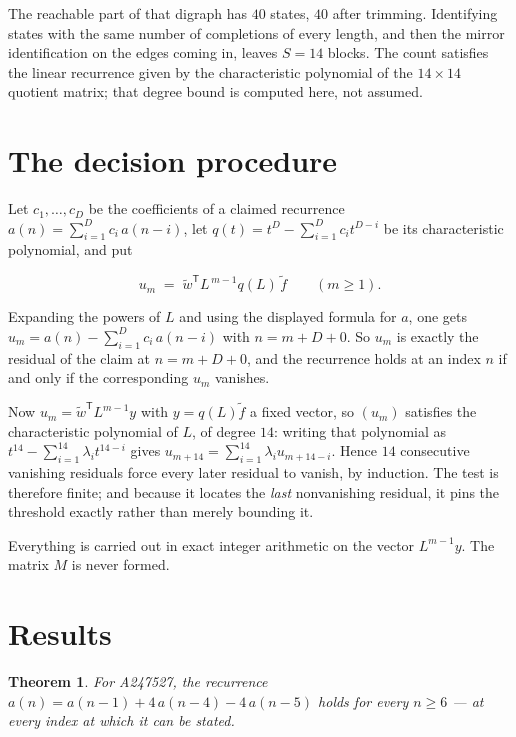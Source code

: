 \documentclass[11pt]{article}
\newtheorem{theorem}{Theorem}
\theoremstyle{definition}
\begin{document}
The reachable part of that digraph has $40$ states, $40$ after trimming. Identifying states with the same number of completions of every length, and then the mirror identification on the edges coming in, leaves $S = 14$ blocks. The count satisfies the linear recurrence given by the characteristic polynomial of the $14\times14$ quotient matrix; that degree bound is computed here, not assumed.

\section{The decision procedure}

Let $c_1,\dots,c_D$ be the coefficients of a claimed recurrence $a(n) = \sum_{i=1}^{D} c_i\,a(n-i)$, let $q(t) = t^{D} - \sum_{i=1}^{D} c_i t^{D-i}$ be its characteristic polynomial, and put

\[u_m \;=\; \tilde w^{\mathsf T} L^{\,m-1} q(L)\,\tilde f \qquad (m \ge 1).\]

Expanding the powers of $L$ and using the displayed formula for $a$, one gets $u_m = a(n) - \sum_{i=1}^{D} c_i\,a(n-i)$ with $n = m + D + 0$. So $u_m$ is exactly the residual of the claim at $n = m + D + 0$, and the recurrence holds at an index $n$ if and only if the corresponding $u_m$ vanishes.

Now $u_m = \tilde w^{\mathsf T} L^{m-1} y$ with $y = q(L)\tilde f$ a fixed vector, so $(u_m)$ satisfies the characteristic polynomial of $L$, of degree $14$: writing that polynomial as $t^{14} - \sum_{i=1}^{14} \lambda_i t^{14-i}$ gives $u_{m+14} = \sum_{i=1}^{14} \lambda_i u_{m+14-i}$. Hence $14$ consecutive vanishing residuals force every later residual to vanish, by induction. The test is therefore finite; and because it locates the {\itshape last} nonvanishing residual, it pins the threshold exactly rather than merely bounding it.

Everything is carried out in exact integer arithmetic on the vector $L^{m-1}y$. The matrix $M$ is never formed.

\section{Results}

\begin{theorem} For A247527, the recurrence $a(n) = a(n-1) + 4\,a(n-4) - 4\,a(n-5)$ holds for every $n \ge 6$ --- at every index at which it can be stated.\end{theorem}
\end{document}
